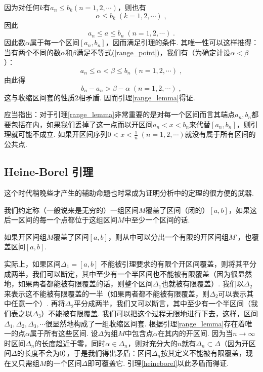 \documentclass[color=cyan,mathpazo,titlestyle=hang]{elegantbook_mac}
\begin{document}
因为对任何$k$有$a_n\leqslant b_k (n=1,2,\cdots)$，则也有
$$
\alpha \leqslant b_k\; (k=1,2,\cdots)\; ,
$$
因此
\begin{equation}\label{range_point}
	a_n\leqslant a\leqslant b_n\; (n=1,2,\cdots)\; .
\end{equation}
因此数$\alpha$属于每一个区间$[a_n,b_n]$，因而满足引理的条件. 其唯一性可以这样推得：当有两个不同的数$\alpha$和$\beta$满足不等式(\ref{range_point})，我们有（为确定计设$\alpha<\beta$）：
$$
a_n\leqslant \alpha < \beta \leqslant b_n\; (n=1,2,\cdots)\; ,
$$
由此得
$$
b_n - a_n > \beta - \alpha\; (n=1,2,\cdots)\; ,
$$
这与收缩区间套的性质2\textdegree 相矛盾. 因而引理\ref{range_lemma}得证. 

应当指出：对于引理\ref{range_lemma}非常重要的是对每一个区间而言其端点$a_n,b_n$都要包括在内，如果我们丢掉了这一点而以开区间$a_n<x<b_n$来代替$[a_n,b_n]$，则引理就可能不成立. 如果开区间序列$0<x<\frac{1}{n}\;(n=1,2,\cdots)$就没有属于所有区间的公共点. 

\subsection{Heine-Borel 引理}

这个时代稍晚些才产生的辅助命题也时常成为证明分析中的定理的很方便的武器. 

我们约定称（一般说来是无穷的）一组区间$M$覆盖了区间（闭的）$[a,b]$，如果这后一区间的每一个点都位于这组区间$M$中至少一个区间的话. 

\begin{newlemma}\label{heineborel}
	如果开区间组$M$覆盖了区间$[a,b]$，则从中可以分出一个有限的开区间组$M'$，也覆盖区间$[a,b]$. 
\end{newlemma}

实际上，如果区间$\Delta_1 = [a,b]$ 不能被引理要求的有限个开区间覆盖，则将其平分成两半，我们可以断定，其中至少有一个半区间也不能被有限覆盖（因为很显然地，如果两者都能被有限覆盖的话，则整个区间$\Delta_1$也就被有限覆盖）. 我们以$\Delta_2$来表示这不能被有限覆盖的一半（如果两者都不能被有限覆盖，则$\Delta_2$可以表示其中任意一个）. 再将$\Delta_2$平分成两半，我们又可以断言，其中至少有一个半区间（我们表之以$\Delta_3$）不能被有限覆盖. 我们可以把这个过程无限地进行下去，这样，区间$\Delta_1, \Delta_2, \Delta_3,\cdots$很显然地构成了一组收缩区间套. 根据引理\ref{range_lemma}存在着唯一的点$\alpha$属于所有这些区间. 设$\Delta$为组$M$中包含点$\alpha$在其内的开区间. 因为当$n\to \infty$时区间$\Delta_n$的长度趋近于零，同时$\alpha\in \Delta_n$，则对充分大的$n$就有$\Delta_n\subset \Delta$（因为开区间$\Delta$的长度不会为0），于是我们得出矛盾：区间$\Delta_n$按其定义不能被有限覆盖，现在又只需组$M$的一个区间$\Delta$即可覆盖它. 引理\ref{heineborel}以此矛盾而得证. 
\end{document}
